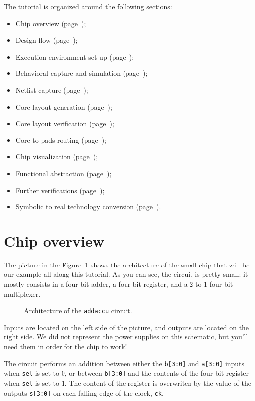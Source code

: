 \documentclass{article}
\begin{document}
The tutorial is organized around the following sections:
\begin{itemize}
\item Chip overview (page~\pageref{chip});
\item Design flow (page~\pageref{desginflow});
\item Execution environment set-up (page~\pageref{setup});
\item Behavioral capture and simulation (page~\pageref{beh});
\item Netlist capture (page~\pageref{netlist});
\item Core layout generation (page~\pageref{layout});
\item Core layout verification (page~\pageref{lv});
\item Core to pads routing (page~\pageref{pads});
\item Chip visualization (page~\pageref{graal});
\item Functional abstraction (page~\pageref{fa});
\item Further verifications (page~\pageref{verif});
\item Symbolic to real technology conversion (page~\pageref{sr}).
\end{itemize}


%
\section{Chip overview}
\label{chip}
The picture in the Figure~\ref{archi} shows the architecture of the 
small chip that will be our example all along this tutorial.
As you can see, the circuit is pretty small: it mostly consists in a 
four bit adder, a four bit register, and a 2 to 1 four bit multiplexer.

\begin{figure}\center
\leavevmode{}
\caption{\label{archi}Architecture of the \texttt{addaccu} circuit.}
\end{figure}

Inputs are located on the left side of the picture, and outputs are 
located on the right side.
We did not represent the power supplies on this schematic, but you'll
need them in order for the chip to work!

The circuit performs an addition between either the \texttt{b[3:0]} and 
\texttt{a[3:0]} inputs when \texttt{sel} is set to 0, or between
\texttt{b[3:0]} and the contents of the four bit register when \texttt{sel} 
is set to 1.
The content of the register is overwriten by the value of the outputs 
\texttt{s[3:0]} on each falling edge of the clock, \texttt{ck}.
\end{document}
